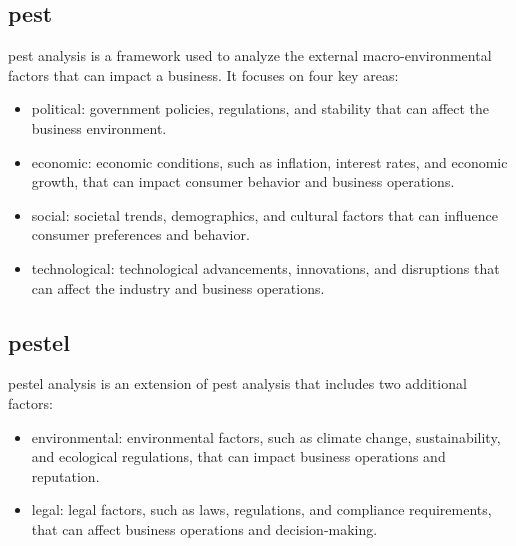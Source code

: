 \documentclass[12pt,a4paper]{report}
\begin{document}
\subsection{pest}
pest analysis is a framework used to analyze the external macro-environmental factors that can impact a business. It focuses on four key areas:
\begin{itemize}
    \item political: government policies, regulations, and stability that can affect the business environment.
    \item economic: economic conditions, such as inflation, interest rates, and economic growth, that can impact consumer behavior and business operations.
    \item social: societal trends, demographics, and    cultural factors that can influence consumer preferences and behavior.
    \item technological: technological advancements, innovations, and disruptions that can affect the industry and business operations.
\end{itemize}
\subsection{pestel}
pestel analysis is an extension of pest analysis that includes two additional factors:
\begin{itemize}
    \item environmental: environmental factors, such as climate change, sustainability, and ecological regulations, that can impact business operations and reputation.
    \item legal: legal factors, such as laws, regulations, and compliance requirements, that can affect business operations and decision-making.
\end{itemize}
\end{document}
